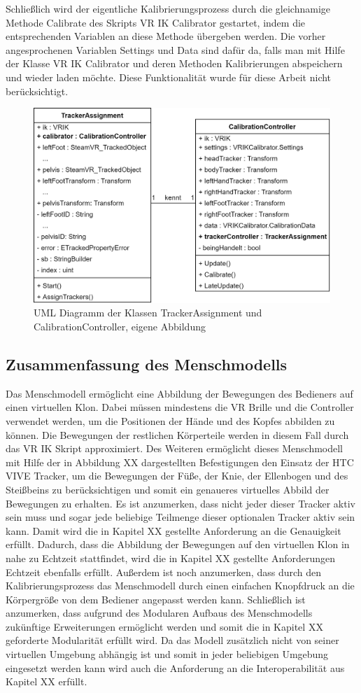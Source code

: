 Schließlich wird der eigentliche Kalibrierungsprozess durch die gleichnamige Methode Calibrate des Skripts VR IK Calibrator gestartet, indem die entsprechenden Variablen an diese Methode übergeben werden. Die vorher angesprochenen Variablen Settings und Data sind dafür da, falls man mit Hilfe der Klasse VR IK Calibrator und deren Methoden Kalibrierungen abspeichern und wieder laden möchte. Diese Funktionalität wurde für diese Arbeit nicht berücksichtigt.
\begin{figure}[h]
	\centering
	\includegraphics[width=0.65\linewidth]{Bilder/A40_MenschUML}
	\caption{UML Diagramm der Klassen TrackerAssignment und CalibrationController, eigene Abbildung}
	\label{fig:MenschUML}
\end{figure}

\subsection{Zusammenfassung des Menschmodells}\label{sec:MMFunktionen}
Das Menschmodell ermöglicht eine Abbildung der Bewegungen des Bedieners auf einen virtuellen Klon. Dabei müssen mindestens die VR Brille und die Controller verwendet werden, um die Positionen der Hände und des Kopfes abbilden zu können. Die Bewegungen der restlichen Körperteile werden in diesem Fall durch das VR IK Skript approximiert. Des Weiteren ermöglicht dieses Menschmodell mit Hilfe der in Abbildung XX dargestellten Befestigungen den Einsatz der HTC VIVE Tracker, um die Bewegungen der Füße, der Knie, der Ellenbogen und des Steißbeins zu berücksichtigen und somit ein genaueres virtuelles Abbild der Bewegungen zu erhalten. Es ist anzumerken, dass nicht jeder dieser Tracker aktiv sein muss und sogar jede beliebige Teilmenge dieser optionalen Tracker aktiv sein kann. Damit wird die in Kapitel XX gestellte Anforderung an die Genauigkeit erfüllt. Dadurch, dass die Abbildung der Bewegungen auf den virtuellen Klon in nahe zu Echtzeit stattfindet, wird die in Kapitel XX gestellte Anforderungen Echtzeit ebenfalls erfüllt. Außerdem ist noch anzumerken, dass durch den Kalibrierungsprozess das Menschmodell durch einen einfachen Knopfdruck an die Körpergröße von dem Bediener angepasst werden kann. Schließlich ist anzumerken, dass aufgrund des Modularen Aufbaus des Menschmodells zukünftige Erweiterungen ermöglicht werden und somit die in Kapitel XX geforderte Modularität erfüllt wird. Da das Modell zusätzlich nicht von seiner virtuellen Umgebung abhängig ist und somit in jeder beliebigen Umgebung eingesetzt werden kann wird auch die Anforderung an die Interoperabilität aus Kapitel XX erfüllt.
